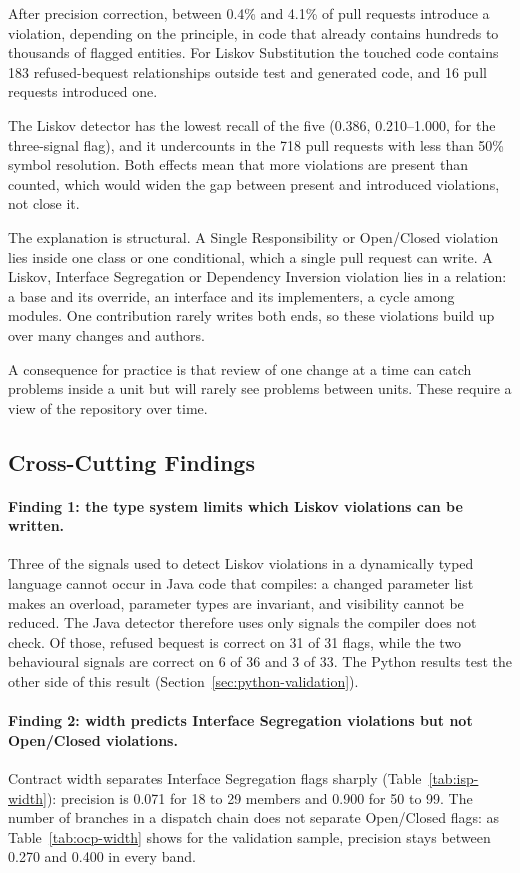 After precision correction, between 0.4\% and 4.1\% of pull requests introduce a violation, depending
on the principle, in code that already contains hundreds to thousands of flagged entities. For Liskov
Substitution the touched code contains 183 refused-bequest relationships outside test and generated
code, and 16 pull requests introduced one.

The Liskov detector has the lowest recall of the five (0.386, 0.210--1.000, for the three-signal
flag), and it undercounts in the 718 pull requests with less than 50\% symbol resolution. Both
effects mean that more violations are present than counted, which would widen the gap between
present and introduced violations, not close it.

The explanation is structural. A Single Responsibility or Open/Closed violation lies inside one
class or one conditional, which a single pull request can write. A Liskov, Interface Segregation or
Dependency Inversion violation lies in a relation: a base and its override, an interface and its
implementers, a cycle among modules. One contribution rarely writes both ends, so these violations
build up over many changes and authors.

A consequence for practice is that review of one change at a time can catch problems inside a unit
but will rarely see problems between units. These require a view of the repository over time.

\subsection{Cross-Cutting Findings}
\label{sec:findings}

\paragraph{Finding 1: the type system limits which Liskov violations can be written.} Three of the
signals used to detect Liskov violations in a dynamically typed language cannot occur in Java code
that compiles: a changed parameter list makes an overload, parameter types are invariant, and
visibility cannot be reduced. The Java detector therefore uses only signals the compiler does not
check. Of those, refused bequest is correct on 31 of 31 flags, while the two behavioural signals are
correct on 6 of 36 and 3 of 33. The Python results test the other side of this result
(Section~\ref{sec:python-validation}).

\paragraph{Finding 2: width predicts Interface Segregation violations but not Open/Closed
violations.} Contract width separates Interface Segregation flags sharply
(Table~\ref{tab:isp-width}): precision is 0.071 for 18 to 29 members and 0.900 for 50 to 99. The
number of branches in a dispatch chain does not separate Open/Closed flags: as Table~\ref{tab:ocp-width}
shows for the validation sample, precision stays between 0.270 and 0.400 in every band.


